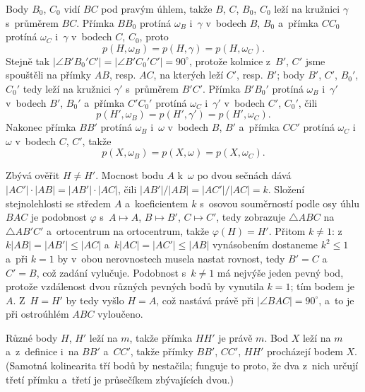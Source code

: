 {    Body $B_0$, $C_0$ vidí $BC$ pod pravým úhlem, takže $B$, $C$, $B_0$, $C_0$ leží na kružnici $\gamma$ s~průměrem $BC$. Přímka $BB_0$ protíná $\omega_B$ i~$\gamma$ v~bodech $B$, $B_0$ a~přímka $CC_0$ protíná $\omega_C$ i~$\gamma$ v~bodech $C$, $C_0$, proto
    $$
    p(H,\omega_B) = p(H,\gamma) = p(H,\omega_C).
    $$
    Stejně tak $|\angle B'B_0'C'| = |\angle B'C_0'C'| = 90^\circ$, protože kolmice z~$B'$, $C'$ jsme spouštěli na přímky $AB$, resp. $AC$, na kterých leží $C'$, resp. $B'$; body $B'$, $C'$, $B_0'$, $C_0'$ tedy leží na kružnici $\gamma'$ s~průměrem $B'C'$. Přímka $B'B_0'$ protíná $\omega_B$ i~$\gamma'$ v~bodech $B'$, $B_0'$ a~přímka $C'C_0'$ protíná $\omega_C$ i~$\gamma'$ v~bodech $C'$, $C_0'$, čili
    $$
    p(H',\omega_B) = p(H',\gamma') = p(H',\omega_C).
    $$
    Nakonec přímka $BB'$ protíná $\omega_B$ i~$\omega$ v~bodech $B$, $B'$ a~přímka $CC'$ protíná $\omega_C$ i~$\omega$ v~bodech $C$, $C'$, takže
    $$
    p(X,\omega_B) = p(X,\omega) = p(X,\omega_C).
    $$

    Zbývá ověřit $H \neq H'$. Mocnost bodu $A$ k~$\omega$ po dvou sečnách dává $|AC'| \cdot |AB| = |AB'| \cdot |AC|$, čili $|AB'|/|AB| = |AC'|/|AC| = k$. Složení stejnolehlosti se středem $A$ a~koeficientem $k$ s~osovou souměrností podle osy úhlu $BAC$ je podobnost $\varphi$ s~$A \mapsto A$, $B \mapsto B'$, $C \mapsto C'$, tedy zobrazuje $\triangle ABC$ na $\triangle AB'C'$ a~ortocentrum na ortocentrum, takže $\varphi(H) = H'$. Přitom $k \neq 1$: z~$k|AB| = |AB'| \leq |AC|$ a~$k|AC| = |AC'| \leq |AB|$ vynásobením dostaneme $k^2 \leq 1$ a~při $k = 1$ by v~obou nerovnostech musela nastat rovnost, tedy $B' = C$ a~$C' = B$, což zadání vylučuje. Podobnost s~$k \neq 1$ má nejvýše jeden pevný bod, protože vzdálenost dvou různých pevných bodů by vynutila $k = 1$; tím bodem je $A$. Z~$H = H'$ by tedy vyšlo $H = A$, což nastává právě při $|\angle BAC| = 90^\circ$, a~to je při ostroúhlém $ABC$ vyloučeno.

    Různé body $H$, $H'$ leží na $m$, takže přímka $HH'$ je právě $m$. Bod $X$ leží na $m$ a~z~definice i~na $BB'$ a~$CC'$, takže přímky $BB'$, $CC'$, $HH'$ procházejí bodem $X$. (Samotná kolinearita tří bodů by nestačila; funguje to proto, že dva z~nich určují třetí přímku a~třetí je průsečíkem zbývajících dvou.)
}

